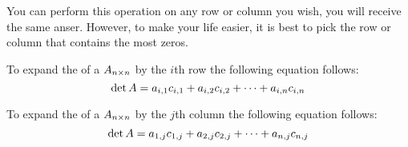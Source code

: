 \begin{remark*}
  You can perform this operation on any row or column you wish, you will receive the same anser.
  However, to make your life easier, it is best to pick the row or column that contains the most zeros.
\end{remark*}

To expand the  of a  $A_{n \times n}$ by the $i$th row the following equation follows:
\begin{equation}\label{eq:Determinant_Expand_ith_Row}
  \det A = a_{i,1} c_{i,1} + a_{i,2} c_{i,2} + \cdots + a_{i,n} c_{i,n}
\end{equation}

To expand the  of a  $A_{n \times n}$ by the $j$th column the following equation follows:
\begin{equation}\label{eq:Determinant_Expand_jth_Column}
  \det A = a_{1,j} c_{1,j} + a_{2,j} c_{2,j} + \cdots + a_{n,j} c_{n,j}
\end{equation}

